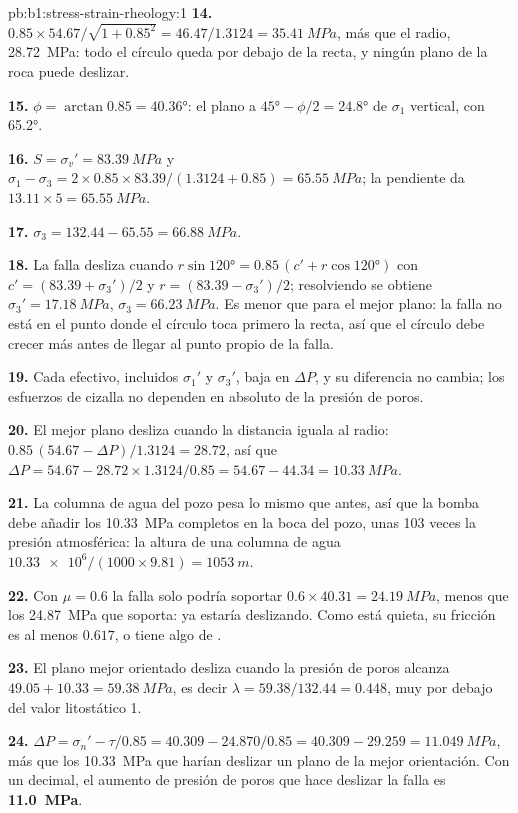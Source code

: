 \begin{solution}{pb:b1:stress-strain-rheology:1}
\textbf{14.} $0.85\times54.67/\sqrt{1 + 0.85^2} = 46.47/1.3124 =
\qty{35.41}{MPa}$, más que el radio, \qty{28.72}{MPa}: todo el círculo queda
por debajo de la recta, y ningún plano de la roca puede deslizar.

\textbf{15.} $\phi = \arctan0.85 = \ang{40.36}$: el plano a
$\ang{45} - \phi/2 = \ang{24.8}$ de $\sigma_1$ vertical, con 
\ang{65.2}.

\textbf{16.} $S = \sigma_v' = \qty{83.39}{MPa}$ y
$\sigma_1 - \sigma_3 = 2\times0.85\times83.39/(1.3124 + 0.85) =
\qty{65.55}{MPa}$; la pendiente da $13.11\times5 = \qty{65.55}{MPa}$.

\textbf{17.} $\sigma_3 = 132.44 - 65.55 = \qty{66.88}{MPa}$.

\textbf{18.} La falla desliza cuando
$r\sin\ang{120} = 0.85\,(c' + r\cos\ang{120})$ con
$c' = (83.39 + \sigma_3')/2$ y $r = (83.39 - \sigma_3')/2$; resolviendo se obtiene
$\sigma_3' = \qty{17.18}{MPa}$, $\sigma_3 = \qty{66.23}{MPa}$. Es menor que
para el mejor plano: la falla no está en el punto donde el círculo toca
primero la recta, así que el círculo debe crecer más antes de llegar al
punto propio de la falla.

\textbf{19.} Cada  efectivo, incluidos $\sigma_1'$ y $\sigma_3'$,
baja en $\Delta P$, y su diferencia no cambia; los esfuerzos de cizalla no
dependen en absoluto de la presión de poros.

\textbf{20.} El mejor plano desliza cuando la distancia iguala al radio:
$0.85\,(54.67 - \Delta P)/1.3124 = 28.72$, así que
$\Delta P = 54.67 - 28.72\times1.3124/0.85 = 54.67 - 44.34 = \qty{10.33}{MPa}$.

\textbf{21.} La columna de agua del pozo pesa lo mismo que antes, así que la
bomba debe añadir los \qty{10.33}{MPa} completos en la boca del pozo, unas 103
veces la presión atmosférica: la altura de una columna de agua
$\num{10.33e6}/(1000\times9.81) = \qty{1053}{m}$.

\textbf{22.} Con $\mu = 0.6$ la falla solo podría soportar
$0.6\times40.31 = \qty{24.19}{MPa}$, menos que los \qty{24.87}{MPa} que
soporta: ya estaría deslizando. Como está quieta, su fricción es al menos
$0.617$, o tiene algo de .

\textbf{23.} El plano mejor orientado desliza cuando la presión de poros alcanza
$49.05 + 10.33 = \qty{59.38}{MPa}$, es decir $\lambda = 59.38/132.44 = 0.448$,
muy por debajo del valor litostático 1.

\textbf{24.} $\Delta P = \sigma_n' - \tau/0.85 = 40.309 - 24.870/0.85 = 40.309 -
29.259 = \qty{11.049}{MPa}$, más que los \qty{10.33}{MPa} que harían deslizar un
plano de la mejor orientación. Con un decimal, el aumento de presión de poros que
hace deslizar la falla es \textbf{\qty[text-series-to-math=true]{11.0}{MPa}}.
\end{solution}
